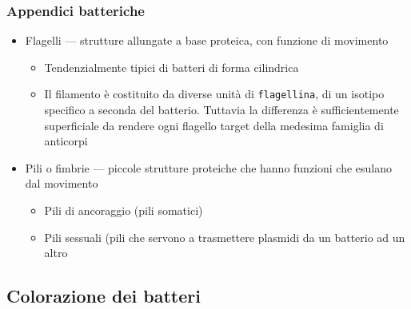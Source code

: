\documentclass[italian,]{article}
\providecommand{\tightlist}{%
  \setlength{\itemsep}{0pt}\setlength{\parskip}{0pt}}
\begin{document}
\hypertarget{appendici-batteriche}{%
\subsubsection{Appendici batteriche}\label{appendici-batteriche}}

\begin{itemize}
\tightlist
\item
  Flagelli --- strutture allungate a base proteica, con funzione di
  movimento

  \begin{itemize}
  \tightlist
  \item
    Tendenzialmente tipici di batteri di forma cilindrica
  \item
    Il filamento è costituito da diverse unità di \texttt{flagellina},
    di un isotipo specifico a seconda del batterio. Tuttavia la
    differenza è sufficientemente superficiale da rendere ogni flagello
    target della medesima famiglia di anticorpi
  \end{itemize}
\item
  Pili o fimbrie --- piccole strutture proteiche che hanno funzioni che
  esulano dal movimento

  \begin{itemize}
  \tightlist
  \item
    Pili di ancoraggio (pili somatici)
  \item
    Pili sessuali (pili che servono a trasmettere plasmidi da un
    batterio ad un altro
  \end{itemize}
\end{itemize}

\hypertarget{colorazione-dei-batteri}{%
\subsection{Colorazione dei batteri}\label{colorazione-dei-batteri}}
\end{document}
